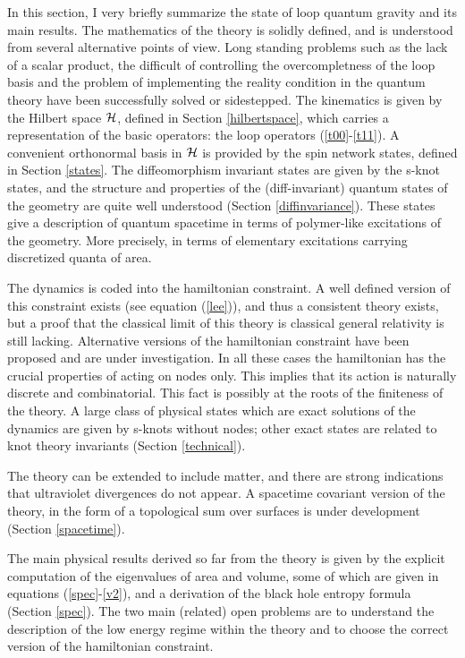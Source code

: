 \documentclass[12pt]{article}
\begin{document}
In this section, I very briefly summarize the state of loop quantum 
gravity and its main results.  The mathematics of the theory is 
solidly defined, and is understood from several alternative points of 
view.  Long standing problems such as the lack of a scalar product, 
the difficult of controlling the overcompletness of the loop basis and 
the problem of implementing the reality condition in the quantum 
theory have been successfully solved or sidestepped.  The kinematics is 
given by the Hilbert space $\cal H$, defined in Section 
\ref{hilbertspace}, which carries a representation of the basic 
operators: the loop operators (\ref{t00}-\ref{t11}).  A convenient 
orthonormal basis in $\cal H$ is provided by the spin network states, 
defined in Section \ref{states}.  The diffeomorphism invariant states 
are given by the s-knot states, and the structure and properties of 
the (diff-invariant) quantum states of the geometry are quite well 
understood (Section \ref{diffinvariance}).  These states give a 
description of quantum spacetime in terms of polymer-like excitations 
of the geometry.  More precisely, in terms of elementary excitations 
carrying discretized quanta of area.

The dynamics is coded into the hamiltonian constraint.  A well defined 
version of this constraint exists (see equation (\ref{lee})), and thus 
a consistent theory exists, but a proof that the classical limit of 
this theory is classical general relativity is still lacking.  Alternative 
versions of the hamiltonian constraint have been proposed and are 
under investigation.  In all these cases the hamiltonian has the 
crucial properties of acting on nodes only.  This implies that its 
action is naturally discrete and combinatorial.  This fact is possibly 
at the roots of the finiteness of the theory.  A large class of 
physical states which are exact solutions of the dynamics are given by 
s-knots without nodes; other exact states are related to knot theory 
invariants (Section \ref{technical}).

The theory can be extended to include matter, and there are strong 
indications that ultraviolet divergences do not appear.  A spacetime 
covariant version of the theory, in the form of a topological sum over 
surfaces is under development (Section \ref{spacetime}).

The main physical results derived so far from the theory is given 
by the explicit computation of the eigenvalues of area and volume, 
some of which are given in equations (\ref{spec}-\ref{v2}), and a 
derivation of the black hole entropy formula (Section \ref{spec}).  
The two main (related) open problems are to understand the 
description of the low energy regime within the theory and to 
choose the correct version of the hamiltonian constraint.
\end{document}
